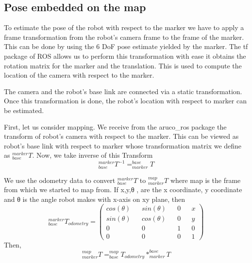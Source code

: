 \documentclass[12pt]{article}
\begin{document}
\subsection{Pose embedded on the map}
\par To estimate the pose of the robot with respect to the marker we have to apply a frame transformation from the robot’s camera frame to the frame of the marker. This can be done by using the 6 DoF pose estimate yielded by the marker. The tf package of ROS allows us to perform this transformation with ease it obtains the rotation matrix for the marker and the translation. This is used to compute the location of the camera with respect to the marker.
\par The camera and the robot’s base link are connected via a static transformation. Once this transformation is done, the robot’s location with respect to marker can be estimated. 
\par First, let us consider mapping. We receive from the aruco\_ros package the transform of robot’s camera with respect to the marker. This can be viewed as robot’s base link with respect to marker whose transformation matrix we define as  $^{marker}_{base}T $. Now, we take inverse of this Transform
\begin{equation}
    ^{marker}_{base}T^{-1}
    =^{base}_{marker}T
\end{equation}


\par We use the odometry data to convert $^{marker}_{base}T $ to $^{map}_{marker}T $ where map is the frame from which we started to map from. If x,y,θ , are the x coordinate, y coordinate and θ is the angle robot makes with x-axis on xy plane, then
\begin{equation}
    ^{marker}_{base}T_{odometry} = 
    \begin{pmatrix}
    cos(\theta) && sin(\theta) &&0 &&x \\
    sin(\theta) && cos(\theta) &&0 &&y \\
    0 && 0&& 1&& 0 \\
    0 && 0&& 0&& 1
    \end{pmatrix}
    \end{equation}
Then,
\begin{equation}
    ^{map}_{marker}T = ^{map}_{base}T_{odometry}*^{base}_{marker}T
\end{equation}
\end{document}
